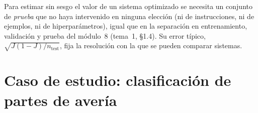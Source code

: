 \begin{corolario}\label{cor:protocolo}
Para estimar sin sesgo el valor de un sistema optimizado se necesita un conjunto de \emph{prueba} que no haya intervenido en ninguna elección (ni de instrucciones, ni de ejemplos, ni de hiperparámetros), igual que en la separación en entrenamiento, validación y prueba del módulo~8 (tema~1, §1.4). Su error típico, $\sqrt{J(1-J)/n_{\mathrm{test}}}$, fija la resolución con la que se pueden comparar sistemas.
\end{corolario}

\section{Caso de estudio: clasificación de partes de avería}

